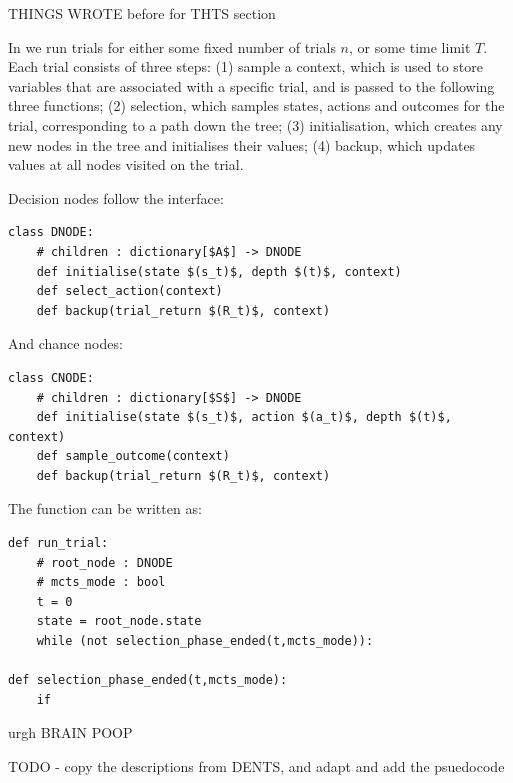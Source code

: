     
    



\clearpage
THINGS WROTE before for THTS section 
\clearpage







        
        In \thtspp\ewe we run trials for either some fixed number of trials $n$, or some time limit $T$. Each trial 
        consists of three steps: 
        (1) sample a context, which is used to store variables that are associated with a specific trial, and is passed to the following three functions;
        (2) selection, which samples states, actions and outcomes for the trial, corresponding to a path down the tree;
        (3) initialisation, which creates any new nodes in the tree and initialises their values;
        (4) backup, which updates values at all nodes visited on the trial.

        Decision nodes follow the interface:
        \begin{lstlisting}
class DNODE:
    # children : dictionary[$A$] -> DNODE
    def initialise(state $(s_t)$, depth $(t)$, context)
    def select_action(context)
    def backup(trial_return $(R_t)$, context)
        \end{lstlisting}

        And chance nodes:
        \begin{lstlisting}
class CNODE:
    # children : dictionary[$S$] -> DNODE
    def initialise(state $(s_t)$, action $(a_t)$, depth $(t)$, context)
    def sample_outcome(context)
    def backup(trial_return $(R_t)$, context)
        \end{lstlisting}

        The \runtrial function can be written as:
        \begin{lstlisting}
def run_trial:
    # root_node : DNODE
    # mcts_mode : bool
    t = 0
    state = root_node.state
    while (not selection_phase_ended(t,mcts_mode)):

def selection_phase_ended(t,mcts_mode):
    if 
        \end{lstlisting}


        urgh BRAIN POOP

        TODO - copy the descriptions from DENTS, and adapt and add the psuedocode








